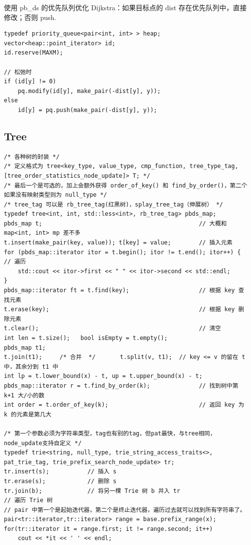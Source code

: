 \par 使用 pb\_ds 的优先队列优化 Dijkstra：如果目标点的 dist 存在优先队列中，直接修改；否则 push. 

\begin{verbatim}
typedef priority_queue<pair<int, int> > heap;
vector<heap::point_iterator> id;
id.reserve(MAXM);

// 松弛时
if (id[y] != 0)
    pq.modify(id[y], make_pair(-dist[y], y));
else
    id[y] = pq.push(make_pair(-dist[y], y));
\end{verbatim}

\subsection{Tree}
\begin{verbatim}
/* 各种树的封装 */
/* 定义格式为 tree<key_type, value_type, cmp_function, tree_type_tag, [tree_order_statistics_node_update]> T; */
/* 最后一个是可选的，加上会额外获得 order_of_key() 和 find_by_order()，第二个如果没有映射类型则为 null_type */
/* tree_tag 可以是 rb_tree_tag(红黑树)，splay_tree_tag（伸展树） */
typedef tree<int, int, std::less<int>, rb_tree_tag> pbds_map;
pbds_map t;                                             // 大概和 map<int, int> mp 差不多 
t.insert(make_pair(key, value)); t[key] = value;        // 插入元素
for (pbds_map::iterator itor = t.begin(); itor != t.end(); itor++) {    // 遍历
    std::cout << itor->first << " " << itor->second << std::endl;
}
pbds_map::iterator ft = t.find(key);                    // 根据 key 查找元素
t.erase(key);                                           // 根据 key 删除元素
t.clear();                                              // 清空
int len = t.size();   bool isEmpty = t.empty();
pbds_map t1;
t.join(t1);     /* 合并  */       t.split(v, t1);  // key <= v 的留在 t 中，其余分到 t1 中
int lp = t.lower_bound(x) - t, up = t.upper_bound(x) - t;
pbds_map::iterator r = t.find_by_order(k);              // 找到树中第 k+1 大/小的数
int order = t.order_of_key(k);                          // 返回 key 为 k 的元素是第几大

/* 第一个参数必须为字符串类型，tag也有别的tag，但pat最快，与tree相同，node_update支持自定义 */
typedef trie<string, null_type, trie_string_access_traits<>, pat_trie_tag, trie_prefix_search_node_update> tr;
tr.insert(s);           // 插入 s 
tr.erase(s);            // 删除 s 
tr.join(b);             // 将另一棵 Trie 树 b 并入 tr 
// 遍历 Trie 树
// pair 中第一个是起始迭代器，第二个是终止迭代器，遍历过去就可以找到所有字符串了。 
pair<tr::iterator,tr::iterator> range = base.prefix_range(x);
for(tr::iterator it = range.first; it != range.second; it++)
    cout << *it << ' ' << endl;
\end{verbatim}


